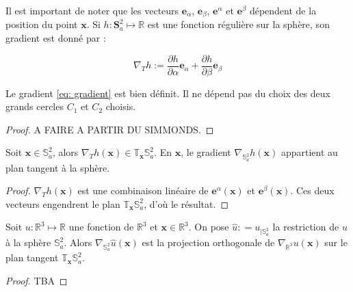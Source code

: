 Il est important de noter que les vecteurs $\mathbf{e}_{\alpha}$, $\mathbf{e}_{\beta}$, $\mathbf{e}^{\alpha}$ et $\mathbf{e}^{\beta}$ dépendent de la position du point $\mathbf{x}$. 
Si $h : \mathbf{S}_a^2 \mapsto \mathbb{R}$ est une fonction régulière sur la sphère, son gradient est donné par :

\begin{equation}
\nabla_{T} h := \dfrac{\partial h}{\partial \alpha} \mathbf{e}_{\alpha} + \dfrac{\partial h}{\partial \beta} \mathbf{e}_{\beta}
\label{eq: gradient}
\end{equation}

\begin{proposition}
Le gradient \eqref{eq: gradient} est bien définit. Il ne dépend pas du choix des deux grands cercles $C_1$ et $C_2$ choisis.
\end{proposition}

\begin{proof}
A FAIRE A PARTIR DU SIMMONDS.
\end{proof}

\begin{proposition}
Soit $\mathbf{x} \in \mathbb{S}_a^2$, alors $\nabla_{T} h (\mathbf{x}) \in \mathbb{T}_{\mathbf{x}} \mathbb{S}_a^2$. En $\mathbf{x}$, le gradient $\nabla_{\mathbb{S}_a^2} h (\mathbf{x})$ appartient au plan tangent à la sphère.
\end{proposition}

\begin{proof}
$\nabla_{T} h (\mathbf{x})$ est une combinaison linéaire de $\mathbf{e}^{\alpha}(\mathbf{x})$ et $\mathbf{e}^{\beta}(\mathbf{x})$. Ces deux vecteurs engendrent le plan $\mathbb{T}_{\mathbf{x}}\mathbb{S}_a^2$, d'où le résultat.
\end{proof}

\begin{proposition}
Soit $u: \mathbb{R}^3 \mapsto \mathbb{R}$ une fonction de $\mathbb{R}^3$ et $\mathbf{x} \in \mathbb{R}^3$. On pose $\hat{u} : = u_{|\mathbb{S}_a^2}$ la restriction de $u$ à la sphère $\mathbb{S}_a^2$. Alors $\nabla_{\mathbb{S}_a^2} \hat{u} (\mathbf{x})$ est la projection orthogonale de $\nabla_{\mathbb{R}^3} u (\mathbf{x})$ sur le plan tangent $\mathbb{T}_{\mathbf{x}} \mathbb{S}_a^2$.
\end{proposition}

\begin{proof}
TBA
\end{proof}





